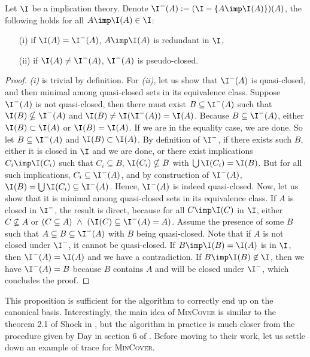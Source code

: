\begin{proposition} Let $\I$ be a  implication theory. 
	Denote $\I^{-}(A) := (\I - \{ A \imp \I(A) \})(A)$, the following holds for 
	all $A \imp \I(A) \in \I$:
	\begin{itemize}
		\item[(i)] if $\I(A) = \I^{-}(A)$, $A \imp \I(A)$ is redundant in $\I$,
		\item[(ii)] if $\I(A) \neq \I^{-}(A)$, $\I^{-}(A)$ is pseudo-closed.
	\end{itemize}
	
\end{proposition}

\begin{proof} \textit{(i)} is trivial by definition. For \textit{(ii)}, let us
show that $\I^{-}(A)$ is quasi-closed, and then minimal among quasi-closed 
sets in its equivalence class. Suppose $\I^{-}(A)$ is not quasi-closed, then 
there must exist $B \subseteq \I^{-}(A)$ such that $\I(B) \nsubseteq \I^{-}(A)$ 
and $\I(B) \neq \I(\I^{-}(A)) = \I(A)$. Because $B \subseteq \I^{-}(A)$, either 
$\I(B) \subset \I(A)$ or $\I(B) = \I(A)$. If we are in the equality case, 
we are done. So let $B \subseteq \I^{-}(A)$ and $\I(B) \subset \I(A)$. By 
definition of $\I^{-}$, if there exists such $B$, either it is closed in 
$\I$ and we are done, or there exist implications $C_i \imp \I(C_i)$ such that 
$C_i \subseteq B$, $\I(C_i) \nsubseteq B$ with $\bigcup \I(C_i) = \I(B)$. But 
for all such implications, $C_i \subseteq \I^{-}(A)$, and by construction of 
$\I^{-}(A)$, $\I(B) = \bigcup \I(C_i) \subseteq \I^{-}(A)$. Hence, 
$\I^{-}(A)$ is indeed quasi-closed. Now, let us show that it is minimal among 
quasi-closed sets in its equivalence class. If $A$ is closed in $\I^{-}$, the 
result is direct, because for all $C \imp \I(C)$ in $\I$, either $C \nsubseteq 
A$ or $(C \subseteq A) \ \land \ (\I(C) \subseteq \I^{-}(A) = A)$. Assume the 
presence of some $B$ such that $A \subseteq B \subseteq \I^{-}(A)$ with $B$ 
being quasi-closed. Note that if $A$ is not closed under $\I^{-}$, it
cannot be quasi-closed. If $B \imp \I(B) = \I(A)$ is in $\I$, then 
$\I^{-}(A) = \I(A)$ and we have a contradiction. If $B \imp \I(B) \not\in \I$, 
then we have $\I^{-}(A) = B$ because $B$ contains $A$ and will be closed under 
$\I^{-}$, which concludes the proof.
\end{proof}

\vspace{1.2em}

This proposition is sufficient for the algorithm to correctly end up on the 
canonical basis. Interestingly, the main idea of \textsc{MinCover} is similar to
the theorem 2.1 of Shock in \cite{shock_computing_1986}, but the algorithm in
practice is much closer from the procedure given by Day in section 6 of 
\cite{day_lattice_1992}. Before moving to their work, let us settle down an 
example of trace for \textsc{MinCover}.

